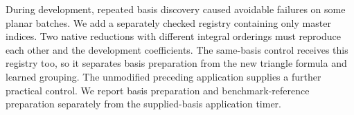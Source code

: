 During development, repeated basis discovery caused avoidable failures on some planar batches. We add a separately checked registry containing only master indices. Two native reductions with different integral orderings must reproduce each other and the development coefficients. The same-basis control receives this registry too, so it separates basis preparation from the new triangle formula and learned grouping. The unmodified preceding application supplies a further practical control. We report basis preparation and benchmark-reference preparation separately from the supplied-basis application timer.
